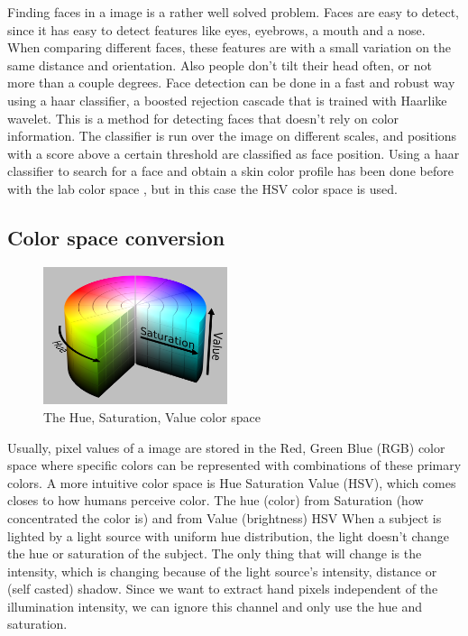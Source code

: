 Finding faces in a image is a rather well solved problem. Faces are easy to detect, since it has easy to detect features like eyes, eyebrows, a mouth and a nose. When comparing different faces, these features are \- with a small variation \- on the same distance and orientation. Also people don't tilt their head often, or not more than a couple degrees. Face detection can be done in a fast and robust way using a haar classifier, a boosted rejection cascade that is trained with Haar\-like wavelet\cite{Lienhart2002}. This is a method for detecting faces that doesn't rely on color information. The classifier is run over the image on different scales, and positions with a score above a certain threshold are classified as face position.  Using a haar classifier to search for a face and obtain a skin color profile has been done before with the lab color space \cite{Stenger2006}, but in this case the HSV color space is used.


\subsection*{Color space conversion}

\begin{figure}
  \vspace{-20pt}
  \begin{center}
    \includegraphics[width=0.48\textwidth]{figures/hsv.png}
 \end{center}
  \vspace{-20pt}
	\caption{The Hue, Saturation, Value color space}
	\label{fig:hsv}
  \vspace{-10pt}
\end{figure}

Usually, pixel values of a image are stored in the Red, Green Blue (RGB) color space where specific colors can be represented with combinations of these primary colors. A more intuitive color space is Hue Saturation Value (HSV), which comes closes to how humans perceive color. The hue (color) from Saturation (how concentrated the color is) and from Value (brightness) HSV When a subject is lighted by a light source with uniform hue distribution, the light doesn't change the hue or saturation of the subject. The only thing that will change is the intensity, which is changing because of the light source's intensity, distance or (self casted) shadow. Since we want to extract hand pixels independent of the illumination intensity, we can ignore this channel and only use the hue and saturation.

